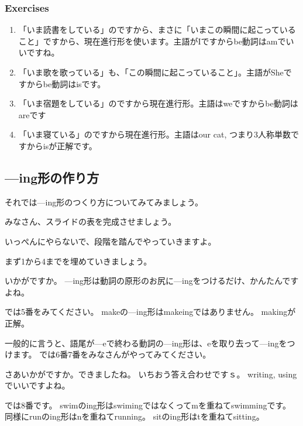 \documentclass[book,jafontscale=0.9247]{jlreq}
\begin{document}
\subsubsection{Exercises}
\begin{enumerate}
 \item 「いま読書をしている」のですから、まさに「いまこの瞬間に起こっていること」ですから、現在進行形を使います。主語がIですからbe動詞はamでいいですね。
 \item 「いま歌を歌っている」も、「この瞬間に起こっていること」。主語がSheですからbe動詞はisです。
 \item 「いま宿題をしている」のですから現在進行形。主語はweですからbe動詞はareです
 \item 「いま寝ている」のですから現在進行形。主語はour cat, つまり3人称単数ですからisが正解です。
\end{enumerate}

\subsection{---ing形の作り方}

それでは---ing形のつくり方についてみてみましょう。

みなさん、スライドの表を完成させましょう。

いっぺんにやらないで、段階を踏んでやっていきますよ。

まず1から4までを埋めていきましょう。

いかがですか。
---ing形は動詞の原形のお尻に---ingをつけるだけ、かんたんですよね。

では5番をみてください。
makeの---ing形はmakeingではありません。
makingが正解。

一般的に言うと、語尾が---eで終わる動詞の---ing形は、eを取り去って---ingをつけます。
では6番7番をみなさんがやってみてください。

さあいかがですか。できましたね。
いちおう答え合わせですｓ。
writing, usingでいいですよね。

では8番です。
swimのing形はswimingではなくってmを重ねてswimmingです。
同様にrunのing形はnを重ねてrunning。
sitのing形はtを重ねてsitting。
\end{document}
